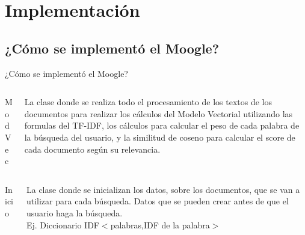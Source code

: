 \section{Implementación}
\subsection{¿Cómo se implementó el Moogle?}
\begin{frame}
    ¿Cómo se implementó el Moogle?
    \vspace{0.5cm}
    {
        \begin{columns}
            \begin{column}{0.3\textwidth}
                ModVec
            \end{column}
            \begin{column}{0.8\textwidth}
                La clase donde se realiza todo el procesamiento de
                los textos de los documentos para realizar los
                cálculos del Modelo Vectorial utilizando las
                formulas del TF-IDF,  los cálculos para calcular el
                peso de cada palabra de la búsqueda del usuario, y
                la similitud de coseno para calcular el score de
                cada documento según su relevancia.

            \end{column}
        \end{columns}
    }
    \pause
    \vspace{0.5cm}
    {
        \begin{columns}
            \begin{column}{0.3\textwidth}
                Inicio
            \end{column}
            \begin{column}{0.8\textwidth}
                La clase donde se inicializan los datos,
                sobre los documentos, que se van a utilizar
                para cada búsqueda. Datos que se pueden
                crear antes de que el usuario haga la
                búsqueda. \\
                Ej. Diccionario IDF$<$palabras,IDF de la palabra$>$


            \end{column}
        \end{columns}
    }
\end{frame}
